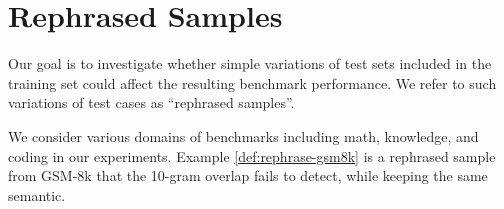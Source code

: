 \section{Rephrased Samples}
\label{sec:rephrase-samples}




Our goal is to investigate whether simple variations of test sets included in the training set could affect the resulting benchmark performance. We refer to such variations of test cases as ``rephrased samples''.

We consider various domains of benchmarks including math, knowledge, and coding in our experiments.
Example \ref{def:rephrase-gsm8k} is a rephrased sample from GSM-8k that the 10-gram overlap fails to detect, while keeping the same semantic.





